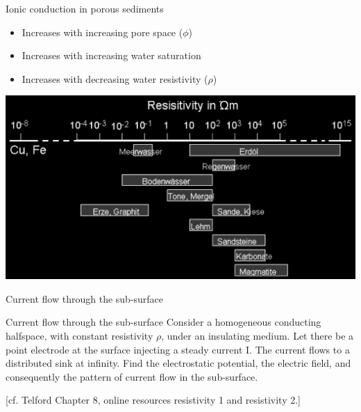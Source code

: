 \begin{frame}
  \begin{PointSix}{Ionic conduction in porous sediments}
    \small
    \begin{itemize}
      \item Increases with increasing pore space ($\phi$)
      \item Increases with increasing water saturation
      \item Increases with decreasing water resistivity ($\rho$)
    \end{itemize}
    \normalsize
    \end{PointSix}
\end{frame}

\begin{frame}
   \begin{center}
    \includegraphics[width=0.8\linewidth]{Figures/Resistivity/ResistivityMaterials.png}
    
  \end{center}
\end{frame}

\begin{frame}{Current flow through the sub-surface}
  \begin{PointSix}{Current flow through the sub-surface}
    \small
    Consider a homogeneous conducting halfspace, with constant resistivity $\rho$, under an insulating medium. Let there be a point electrode at the surface
injecting a steady current I. The current flows to a distributed sink at infinity. Find the electrostatic potential, the electric field, and consequently the pattern of current flow in the sub-surface.

    [cf. Telford Chapter 8, online resources resistivity 1 and resistivity 2.]
  \end{PointSix}
\end{frame}

